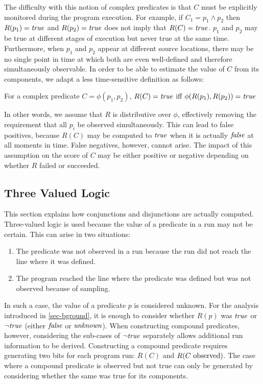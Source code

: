 The difficulty with this notion of complex predicates is that $C$ must be explicitly monitored during the program execution.  For example, if $C_1 = p_1 \wedge p_2$ then $R(p_1) = \mathit{true}$ and $R(p_2) = \mathit{true}$ does not imply that $R(C) = \mathit{true}$.  $p_1$ and $p_2$ may be true at different stages of execution but never true at the same time.  Furthermore, when $p_1$ and $p_2$ appear at different source locations, there may be no single point in time at which both are even well-defined and therefore simultaneously observable.  In order to be able to estimate the value of $C$ from its components, we adapt a less time-sensitive definition as follows:
\begin{defn}
\label{dfn2}
For a complex predicate $C = \phi(p_1, p_2)$, $R(C) = \mathit{true}$ iff $\phi(R(p_1), R(p_2)) = \mathit{true}$
\end{defn}

In other words, we assume that $R$ is distributive over $\phi$, effectively removing the requirement that all $p_i$ be observed simultaneously.  This can lead to false positives, because $R(C)$ may be computed to $\mathit{true}$ when it is actually $\mathit{false}$ at all moments in time.  False negatives, however, cannot arise.  The impact of this assumption on the score of $C$ may be either positive or negative depending on whether $R$ failed or succeeded.

\subsection{Three Valued Logic}
\label{sec-tvl}
This section explains how conjunctions and disjunctions are actually computed.  Three-valued logic is used because the value of a predicate in a run may not be certain. This can arise in two situations:
\begin{enumerate}
\item The predicate was not observed in a run because the run did not reach the line where it was defined.
\item The program reached the line where the predicate was defined but was not observed because of sampling.
\end{enumerate}


In such a case, the value of a predicate $p$ is considered unknown.  For the 
analysis introduced in \autoref{sec-bground}, it is enough to consider whether 
$R(p)$ was $\mathit{true}$ or $\neg \mathit{true}$ (either $\mathit{false}$ or $\mathit{unknown}$).  When 
constructing compound predicates, however, considering the sub-cases of 
$\neg \mathit{true}$ separately allows additional run information to be derived.  
Constructing a compound predicate requires generating two bits for each program
run: $R(C)$ and $R(\text{$C$ observed})$.  The case where a compound predicate is observed but not
true can only be generated by considering whether the same was true for its
components.


